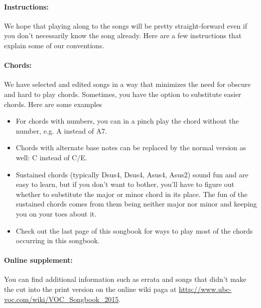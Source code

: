 \paragraph{Instructions: } We hope that playing along to the songs will be 
pretty straight-forward even if you don't necessarily know the song already. 
Here are a few instructions that explain some of our conventions.

\paragraph{Chords: } We have selected and edited songs in a way that 
minimizes the need for obscure and hard to play chords. Sometimes, you have 
the option to substitute easier chords. Here are some examples
\begin{itemize}
\item For chords with numbers, you can in a pinch play the chord without the 
number, e.g. A instead of A7.
\item Chords with alternate base notes can be replaced by the normal version 
as well: C instead of C/E.
\item Sustained chords (typically Dsus4, Dsus4, Asus4, Asus2) sound fun and 
are easy to learn, but if you don't want to bother, you'll have to figure out 
whether to substitute the major or minor chord in its place. The fun of 
the sustained chords comes from them being neither major nor minor and keeping 
you on your toes about it.
\item Check out the last page of this songbook for ways to play most of the 
chords occurring in this songbook.
\end{itemize}

\paragraph{Online supplement: } You can find additional information such as 
errata and songs that didn't make the cut into the print version on the 
online wiki paga at \url{http://www.ubc-voc.com/wiki/VOC_Songbook_2015}.
\vfill
